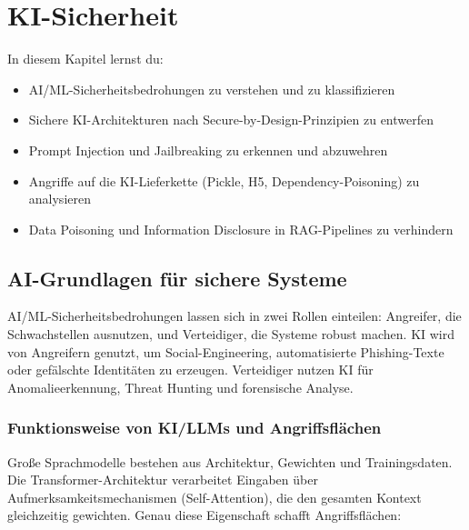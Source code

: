 \chapter{KI-Sicherheit}

\label{chap:ki_sicherheit}

\begin{lernziele}
In diesem Kapitel lernst du:
\begin{itemize}[leftmargin=*]
    \item AI/ML-Sicherheitsbedrohungen zu verstehen und zu klassifizieren
    \item Sichere KI-Architekturen nach Secure-by-Design-Prinzipien zu entwerfen
    \item Prompt Injection und Jailbreaking zu erkennen und abzuwehren
    \item Angriffe auf die KI-Lieferkette (Pickle, H5, Dependency-Poisoning) zu analysieren
    \item Data Poisoning und Information Disclosure in RAG-Pipelines zu verhindern
\end{itemize}
\end{lernziele}

\section{AI-Grundlagen für sichere Systeme}

AI/ML-Sicherheitsbedrohungen lassen sich in zwei Rollen einteilen: Angreifer, die Schwachstellen ausnutzen, und Verteidiger, die Systeme robust machen. KI wird von Angreifern genutzt, um Social-Engineering, automatisierte Phishing-Texte oder gefälschte Identitäten zu erzeugen. Verteidiger nutzen KI für Anomalieerkennung, Threat Hunting und forensische Analyse.

\subsection{Funktionsweise von KI/LLMs und Angriffsflächen}

Große Sprachmodelle bestehen aus Architektur, Gewichten und Trainingsdaten. Die Transformer-Architektur verarbeitet Eingaben über Aufmerksamkeitsmechanismen (Self-Attention), die den gesamten Kontext gleichzeitig gewichten. Genau diese Eigenschaft schafft Angriffsflächen:


